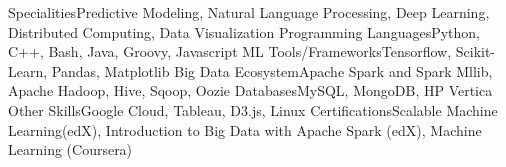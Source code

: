 \begin{cvskills}
\cvskill
{Specialities}{Predictive Modeling, Natural Language Processing, Deep Learning, Distributed Computing, Data Visualization}
\cvskill
{Programming Languages}{Python, C++, Bash, Java, Groovy, Javascript}
\cvskill
{ML Tools/Frameworks}{Tensorflow, Scikit-Learn, Pandas, Matplotlib}
\cvskill
{Big Data Ecosystem}{Apache Spark and Spark Mllib, Apache Hadoop, Hive, Sqoop, Oozie}
\cvskill
{Databases}{MySQL, MongoDB, HP Vertica}
\cvskill
{Other Skills}{Google Cloud, Tableau, D3.js, Linux}
\cvskill
{Certifications}{Scalable Machine Learning(edX), Introduction to Big Data with Apache Spark (edX), Machine Learning (Coursera)}
\end{cvskills}
